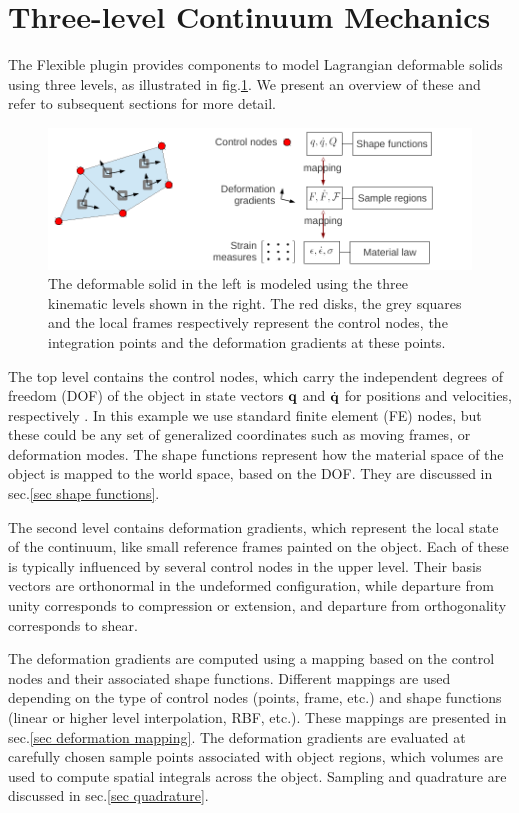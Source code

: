 \section{Three-level Continuum Mechanics}
The Flexible plugin provides components to model Lagrangian deformable solids using three levels, as illustrated in fig.\ref{fig tree levels}.
We present an overview of these and refer to subsequent sections for more detail.
\begin{figure}
 \centering
 \includegraphics[height=0.3\linewidth]{threeLevels.pdf}
 \caption{The deformable solid in the left is modeled using the three kinematic levels shown in the right.
 The red disks, the grey squares and the local frames respectively represent the control nodes, the integration points and the deformation gradients at these points.
 }\label{fig tree levels}
\end{figure}

The top level contains the control nodes, which carry the independent degrees of freedom (DOF) of the object in state vectors $\mathbf{{q}}$ 
and $\dot{\mathbf{{q}}}$ for positions and velocities, respectively . 
In this example we use standard finite element (FE) nodes, but these could be any set of generalized coordinates such as moving frames, or deformation modes.
The shape functions represent how the material space of the object is mapped to the world space, based on the DOF. They are discussed in sec.\ref{sec shape functions}.

The second level contains deformation gradients, which represent the local state of the continuum, like small reference frames painted on the object.
Each of these is typically influenced by several control nodes in the upper level.
Their basis vectors are orthonormal in the undeformed configuration, while departure from unity corresponds to compression or extension, and departure from orthogonality corresponds to shear.

The deformation gradients are computed using a mapping based on the control nodes and their associated shape functions.
Different mappings are used depending on the type of control nodes (points, frame, etc.) and shape functions (linear or higher level interpolation, RBF, etc.). These mappings are presented in sec.\ref{sec deformation mapping}.
The deformation gradients are evaluated at carefully chosen sample points associated with object regions, which volumes are used to compute spatial integrals across the object. Sampling and quadrature are discussed in sec.\ref{sec quadrature}.


